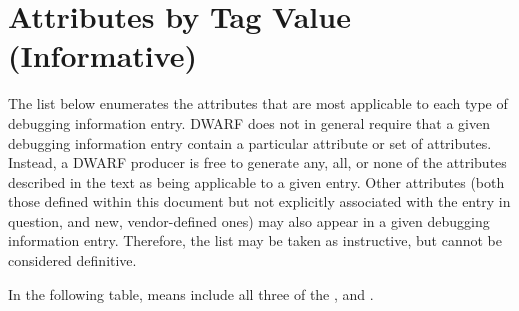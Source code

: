 \chapter[Attributes by Tag (Informative)]{Attributes by Tag Value (Informative)}
\label{chap:attributesbytagvalueinformative}

The list below enumerates the attributes that are
most applicable to each type of debugging information
entry. DWARF does not in general require that a given
debugging information entry contain a particular attribute
or set of attributes. Instead, a DWARF producer is free to
generate any, all, or none of the attributes described in the
text as being applicable to a given entry. Other attributes
(both those defined within this document but not explicitly
associated with the entry in question, and new, vendor-defined
ones) may also appear in a given debugging information
entry. Therefore, the list may be taken as instructive, but
cannot be considered definitive.  

In the following table,
means include all three of the
\DWATdeclcolumn,
\DWATdeclfile{} and 
\DWATdeclline.

